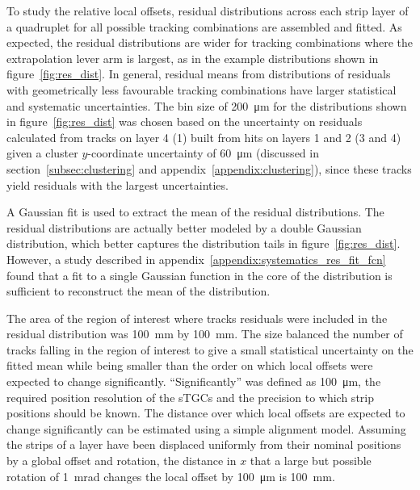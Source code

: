To study the relative local offsets, residual distributions across each strip layer of a quadruplet for all possible tracking combinations are assembled and fitted. As expected, the residual distributions are wider for tracking combinations where the extrapolation lever arm is largest, as in the example distributions shown in figure~\ref{fig:res_dist}. In general, residual means from distributions of residuals with geometrically less favourable tracking combinations have larger statistical and systematic uncertainties. The bin size of \SI{200}{\micro\meter} for the distributions shown in figure~\ref{fig:res_dist} was chosen based on the uncertainty on residuals calculated from tracks on layer 4 (1) built from hits on layers 1 and 2 (3 and 4) given a cluster $y$-coordinate uncertainty of \SI{60}{\micro\meter} (discussed in section~\ref{subsec:clustering} and appendix~\ref{appendix:clustering}), since these tracks yield residuals with the largest uncertainties.

A Gaussian fit is used to extract the mean of the residual distributions. The residual distributions are actually better modeled by a double Gaussian distribution, which better captures the distribution tails in figure~\ref{fig:res_dist}. However, a study described in appendix~\ref{appendix:systematics_res_fit_fcn} found that a fit to a single Gaussian function in the core of the distribution is sufficient to reconstruct the mean of the distribution.

The area of the region of interest where tracks residuals were included in the residual distribution was \SI{100}{\milli\meter} by \SI{100}{\milli\meter}. The size balanced the number of tracks falling in the region of interest to give a small statistical uncertainty on the fitted mean while being smaller than the order on which local offsets were expected to change significantly. ``Significantly'' was defined as \SI{100}{\micro\meter}, the required position resolution of the sTGCs and the precision to which strip positions should be known. The distance over which local offsets are expected to change significantly can be estimated using a simple alignment model. Assuming the strips of a layer have been displaced uniformly from their nominal positions by a global offset and rotation, the distance in $x$ that a large but possible rotation of \SI{1}{mrad} changes the local offset by \SI{100}{\micro\meter} is \SI{100}{mm}.

